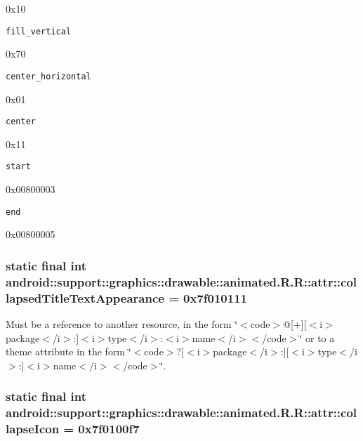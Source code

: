 0x10

{\tt fill\_\-vertical}

0x70

{\tt center\_\-horizontal}

0x01

{\tt center}

0x11

{\tt start}

0x00800003

{\tt end}

0x00800005\hypertarget{classandroid_1_1support_1_1graphics_1_1drawable_1_1animated_1_1_r_1_1attr_2b27485554bac413619a9108a2be85af}{
\subsubsection[{collapsedTitleTextAppearance}]{\setlength{\rightskip}{0pt plus 5cm}static final int android::support::graphics::drawable::animated.R.R::attr::collapsedTitleTextAppearance = 0x7f010111}}
\label{classandroid_1_1support_1_1graphics_1_1drawable_1_1animated_1_1_r_1_1attr_2b27485554bac413619a9108a2be85af}


Must be a reference to another resource, in the form \char`\"{}$<$code$>$@\mbox{[}+\mbox{]}\mbox{[}$<$i$>$package$<$/i$>$:\mbox{]}$<$i$>$type$<$/i$>$:$<$i$>$name$<$/i$>$$<$/code$>$\char`\"{} or to a theme attribute in the form \char`\"{}$<$code$>$?\mbox{[}$<$i$>$package$<$/i$>$:\mbox{]}\mbox{[}$<$i$>$type$<$/i$>$:\mbox{]}$<$i$>$name$<$/i$>$$<$/code$>$\char`\"{}. \hypertarget{classandroid_1_1support_1_1graphics_1_1drawable_1_1animated_1_1_r_1_1attr_e0c3e325857ce5ea1bc4d5abbca7ac43}{
\subsubsection[{collapseIcon}]{\setlength{\rightskip}{0pt plus 5cm}static final int android::support::graphics::drawable::animated.R.R::attr::collapseIcon = 0x7f0100f7}}
\label{classandroid_1_1support_1_1graphics_1_1drawable_1_1animated_1_1_r_1_1attr_e0c3e325857ce5ea1bc4d5abbca7ac43}


